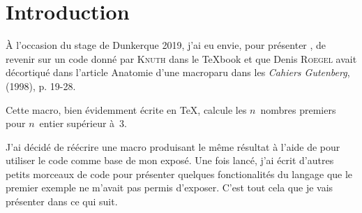 \section{Introduction}
\label{sec:introduction}

À l'occasion du stage de Dunkerque 2019, j'ai eu envie, pour présenter
\Expliii{}, de revenir sur un code donné par \textsc{Knuth} dans le
\TeX book et que Denis \textsc{Roegel} avait décortiqué dans
l'article \og Anatomie d’une macro\fg paru dans les \emph{Cahiers
  Gutenberg},  (1998), p. 19-28.

Cette macro, bien évidemment écrite en \TeX{}, calcule les
\(n\)~nombres premiers pour \(n\)~entier supérieur à~\(3\).

J'ai décidé de réécrire une macro produisant le même résultat à l'aide
de \Expliii{} pour utiliser le code comme base de mon exposé. Une fois
lancé, j'ai écrit d'autres petits morceaux de code pour présenter
quelques fonctionalités du langage que le premier exemple ne m'avait
pas permis d'exposer. C'est tout cela que je vais présenter dans ce
qui suit.

